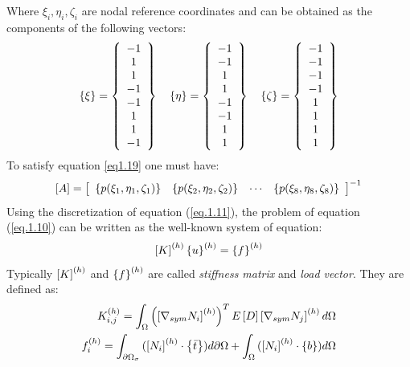 Where $\xi_i,\eta_i,\zeta_i$ are nodal reference coordinates and can be obtained as the components of the following vectors:
\begin{eqnarray}
	\left\lbrace{\xi}\right \rbrace=\left\lbrace{\begin{array}{c}
		-1\\1\\1\\-1\\-1\\1\\1\\-1
		\end{array}}\right \rbrace \quad \left\lbrace{\eta}\right \rbrace=\left\lbrace{\begin{array}{c}
		-1\\-1\\1\\1\\-1\\-1\\1\\1
		\end{array}}\right \rbrace \quad\left\lbrace{\zeta}\right \rbrace=\left\lbrace{\begin{array}{c}
		-1\\-1\\-1\\-1\\1\\1\\1\\1
		\end{array}}\right \rbrace
\end{eqnarray}
To satisfy equation \ref{eq1.19} one must have:
\begin{equation}
\left[{A}\right]=\left[{\begin{array}{cccc}
\left\lbrace{p(\xi_1,\eta_1,\zeta_1)}\right \rbrace&\left\lbrace{p(\xi_2,\eta_2,\zeta_2)}\right \rbrace&\cdots&\left\lbrace{p(\xi_8,\eta_8,\zeta_8)}\right \rbrace
\end{array}}\right]^{-1}
\end{equation}
Using the discretization of equation (\ref{eq.1.11}), the problem of equation (\ref{eq.1.10}) can be written as the well-known system of equation:
\begin{equation}
\label{eq.1.13}
\left[{K}\right]^{(h)}\left\lbrace{u}\right \rbrace^{(h)}=\left\lbrace{f}\right \rbrace^{(h)}
\end{equation}
Typically $\left[{K}\right]^{(h)}$ and $\left\lbrace{f}\right \rbrace^{(h)}$ are called \textit{stiffness matrix} and \textit{load vector}. They are defined as:
\begin{eqnarray}
\label{eq.1.14}
{K}_{i,j}^{(h)}=\int_{\Omega}{\left(\left[{\nabla_{sym}N_i}\right]^{(h)}\right)^T E\left[{D}\right]\left[{\nabla_{sym}N_j}\right]^{(h)}   d\Omega}\\
\label{eq.1.15}
{f}_{i}^{(h)}=\int_{\partial \Omega_{\sigma}}{(\left[{N_i}\right]^{(h)} \cdot \left\lbrace{\bar{t}}\right \rbrace )d\partial \Omega}+\int_{\Omega}{(\left[{N_i}\right]^{(h)}\cdot \left\lbrace{b}\right \rbrace) d\Omega}
\end{eqnarray}
